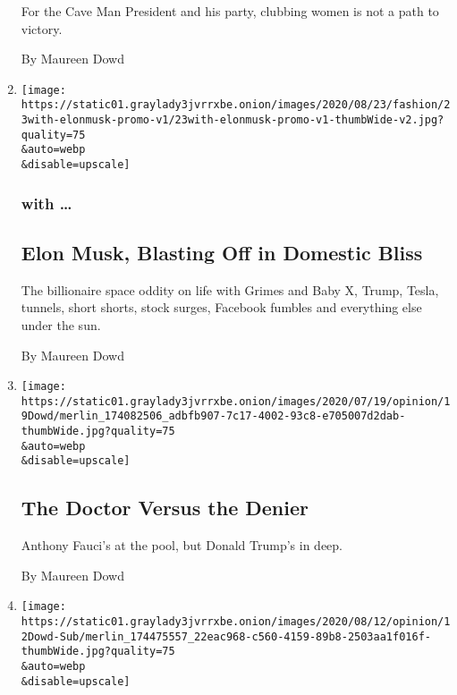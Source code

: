 \begin{enumerate}
  For the Cave Man President and his party, clubbing women is not a path
  to victory.

  By Maureen Dowd
\item
  \href{/2020/07/25/style/elon-musk-maureen-dowd.html}{}

  \texttt{[image: https://static01.graylady3jvrrxbe.onion/images/2020/08/23/fashion/23with-elonmusk-promo-v1/23with-elonmusk-promo-v1-thumbWide-v2.jpg?quality=75\\\&auto=webp\\\&disable=upscale]}

  \hypertarget{with--1}{%
  \subsubsection{with \ldots{}}\label{with--1}}

  \hypertarget{elon-musk-blasting-off-in-domestic-bliss}{%
  \subsection{Elon Musk, Blasting Off in Domestic
  Bliss}\label{elon-musk-blasting-off-in-domestic-bliss}}

  The billionaire space oddity on life with Grimes and Baby X, Trump,
  Tesla, tunnels, short shorts, stock surges, Facebook fumbles and
  everything else under the sun.

  By Maureen Dowd
\item
  \href{/2020/07/18/opinion/sunday/fauci-trump-coronavirus.html}{}

  \texttt{[image: https://static01.graylady3jvrrxbe.onion/images/2020/07/19/opinion/19Dowd/merlin\_174082506\_adbfb907-7c17-4002-93c8-e705007d2dab-thumbWide.jpg?quality=75\\\&auto=webp\\\&disable=upscale]}

  \hypertarget{the-doctor-versus-the-denier}{%
  \subsection{The Doctor Versus the
  Denier}\label{the-doctor-versus-the-denier}}

  Anthony Fauci's at the pool, but Donald Trump's in deep.

  By Maureen Dowd
\item
  \href{/2020/07/11/opinion/sunday/trump-biden-2020.html}{}

  \texttt{[image: https://static01.graylady3jvrrxbe.onion/images/2020/08/12/opinion/12Dowd-Sub/merlin\_174475557\_22eac968-c560-4159-89b8-2503aa1f016f-thumbWide.jpg?quality=75\\\&auto=webp\\\&disable=upscale]}


\end{enumerate}
